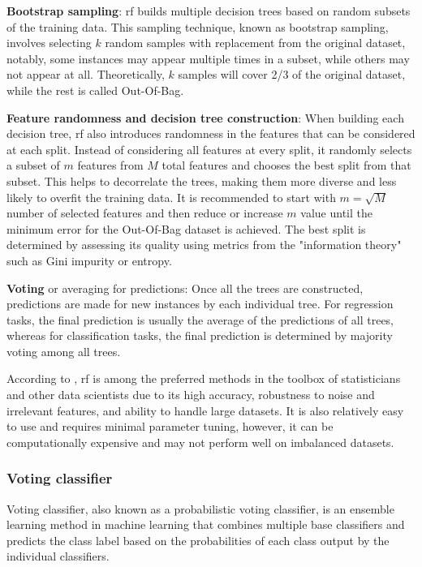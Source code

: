 \textbf{Bootstrap sampling}: \gls{rf} builds multiple decision trees based on random subsets of the training data. This sampling technique, known as bootstrap sampling, involves selecting $k$ random samples with replacement from the original dataset, notably, some instances may appear multiple times in a subset, while others may not appear at all. Theoretically, $k$ samples will cover 2/3 of the original dataset, while the rest is called Out-Of-Bag.

\textbf{Feature randomness and decision tree construction}: When building each decision tree, \gls{rf} also introduces randomness in the features that can be considered at each split. Instead of considering all features at every split, it randomly selects a subset of $m$ features from $M$ total features and chooses the best split from that subset. This helps to decorrelate the trees, making them more diverse and less likely to overfit the training data. It is recommended to start with $m = \sqrt{M}$ number of selected features and then reduce or increase $m$ value until the minimum error for the Out-Of-Bag dataset is achieved. The best split is determined by assessing its quality using metrics from the "information theory" such as Gini impurity or entropy.

\textbf{Voting} or averaging for predictions: Once all the trees are constructed, predictions are made for new instances by each individual tree. For regression tasks, the final prediction is usually the average of the predictions of all trees, whereas for classification tasks, the final prediction is determined by majority voting among all trees.

According to \textcite{Genuer2020}, \gls{rf} is among the preferred methods in the toolbox of statisticians and other data scientists due to its high accuracy, robustness to noise and irrelevant features, and ability to handle large datasets. It is also relatively easy to use and requires minimal parameter tuning, however, it can be computationally expensive and may not perform well on imbalanced datasets.


\subsubsection{Voting classifier}
\label{subsubsec:machine_learning_voting_classifer}

Voting classifier, also known as a probabilistic voting classifier, is an ensemble learning method in machine learning that combines multiple base classifiers and predicts the class label based on the probabilities of each class output by the individual classifiers.

